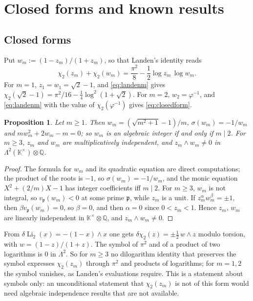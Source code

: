 \documentclass[11pt]{amsart}
\newtheorem{proposition}[theorem]{Proposition}
\theoremstyle{definition}
\theoremstyle{remark}
\numberwithin{equation}{section}
\newcommand{\QQ}{\mathbb{Q}}
\newcommand{\KK}{\mathbb{K}}
\newcommand{\fp}{\mathfrak{p}}
\newcommand{\Li}{\operatorname{Li}}
\begin{document}
\section{Closed forms and known results}\label{sec:closed}

\subsection{Closed forms}
Put $w_m:=(1-z_m)/(1+z_m)$, so that Landen's identity reads
\begin{equation}\label{eq:landenm}
  \chi_2(z_m)+\chi_2(w_m)=\frac{\pi^2}8-\frac12\log z_m\,\log w_m .
\end{equation}
For $m=1$, $z_1=w_1=\sqrt2-1$, and \eqref{eq:landenm} gives $\chi_2(\sqrt2-1)=\pi^2/16-\frac14\log^2(1+\sqrt2)$. For
$m=2$, $w_2=\varphi^{-1}$, and \eqref{eq:landenm} with the value of $\chi_2(\varphi^{-1})$ gives \eqref{eq:closedform}.

\begin{proposition}\label{prop:symbol}
Let $m\ge1$. Then $w_m=(\sqrt{m^2+1}-1)/m$, $\sigma(w_m)=-1/w_m$ and $mw_m^2+2w_m-m=0$; so $w_m$ is an algebraic integer
if and only if $m\mid2$. For $m\ge3$, $z_m$ and $w_m$ are multiplicatively independent, and $z_m\wedge w_m\ne0$ in
$\Lambda^2(\KK^\times)\otimes\QQ$.
\end{proposition}

\begin{proof}
The formula for $w_m$ and its quadratic equation are direct computations; the product of the roots is $-1$, so
$\sigma(w_m)=-1/w_m$, and the monic equation $X^2+(2/m)X-1$ has integer coefficients iff $m\mid2$. For $m\ge3$, $w_m$ is
not integral, so $v_\fp(w_m)<0$ at some prime $\fp$, while $z_m$ is a unit. If $z_m^\alpha w_m^\beta=\pm1$, then
$\beta v_\fp(w_m)=0$, so $\beta=0$, and then $\alpha=0$ since $0<z_m<1$. Hence $z_m$, $w_m$ are linearly independent in
$\KK^\times\otimes\QQ$, and $z_m\wedge w_m\ne0$.
\end{proof}

From $\delta\Li_2(x)=-(1-x)\wedge x$ one gets $\delta\chi_2(z)=\pm\frac12\,w\wedge z$ modulo torsion, with
$w=(1-z)/(1+z)$. The symbol of $\pi^2$ and of a product of two logarithms is $0$ in $\Lambda^2$. So for $m\ge3$ no
dilogarithm identity that preserves the symbol expresses $\chi_2(z_m)$ through $\pi^2$ and products of logarithms; for
$m=1,2$ the symbol vanishes, as Landen's evaluations require. This is a statement about symbols only: an unconditional
statement that $\chi_2(z_m)$ is not of this form would need algebraic independence results that are not available.
\end{document}
